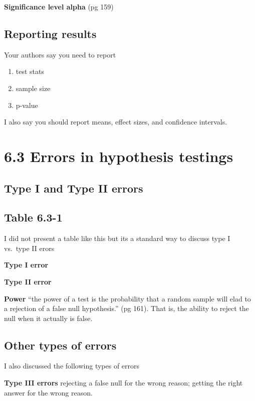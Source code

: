 \documentclass[]{book}
\providecommand{\tightlist}{%
  \setlength{\itemsep}{0pt}\setlength{\parskip}{0pt}}
\theoremstyle{definition}
\theoremstyle{definition}
\theoremstyle{definition}
\theoremstyle{remark}
\begin{document}
\textbf{Significance level alpha} (pg 159)

\subsection{Reporting results}\label{reporting-results}

Your authors say you need to report

\begin{enumerate}
\def\labelenumi{\arabic{enumi}.}
\tightlist
\item
  test stats
\item
  sample size
\item
  p-value
\end{enumerate}

I also say you should report means, effect sizes, and confidence
intervals.

\section{6.3 Errors in hypothesis
testings}\label{errors-in-hypothesis-testings}

\subsection{Type I and Type II errors}\label{type-i-and-type-ii-errors}

\subsection{Table 6.3-1}\label{table-6.3-1}

I did not present a table like this but its a standard way to discuss
type I vs.~type II erors

\textbf{Type I error}

\textbf{Type II error}

\textbf{Power} ``the power of a test is the probability that a random
sample will elad to a rejection of a false null hypothesis.'' (pg 161).
That is, the ability to reject the null when it actually is false.

\subsection{Other types of errors}\label{other-types-of-errors}

I also discussed the following types of errors

\textbf{Type III errors} rejecting a false null for the wrong reason;
getting the right answer for the wrong reason.
\end{document}
